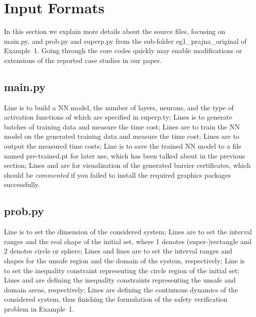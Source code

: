 \documentclass{llncs}
\begin{document}
\section{Input Formats}

In this section we explain more details about the source files, focusing on \textsf{main.py}, and \textsf{prob.py} and \textsf{superp.py} from the sub-folder
{\color{blue}\textsf{eg1\_prajna\_original}} of Example~1. Going through the core codes quickly may enable modifications or extensions of
the reported case studies in our paper.

\subsection{\textsf{main.py}}
Line 
is to build a NN model, the number of layers, neurons, and the type of activation functions of which are specified in \textsf{superp.ty};
Lines
is to generate batches of training data and measure the time cost; 
Lines
are to train the NN model on the generated training data and measure the time cost;
Lines
are to output the measured time costs; 
Line
is to save the trained NN model to a file named \textsf{pre-trained.pt} for later use, which has been talked about in the previous section;
Lines
and
are for visualization of the generated barrier certificates, which should be \emph{commented} if you
failed to install the required graphics packages successfully.

\subsection{\textsf{prob.py}}
Line
is to set the dimension of the considered system; Lines
are to set the interval ranges and the real shape of the initial set, where 1 denotes (super-)rectangle and 
2 denotes circle or sphere; Lines
and lines
are to set the interval ranges and shapes for the unsafe region and the domain of the system, respectively;
Line 
is to set the inequality constraint representing the circle region of the initial set; Lines
and 
are defining the inequality constraints representing the unsafe and domain areas, respectively;
Lines
are defining the continuous dynamics of the considered system, thus finishing the formulation of the
safety verification problem in Example~1.
\end{document}
